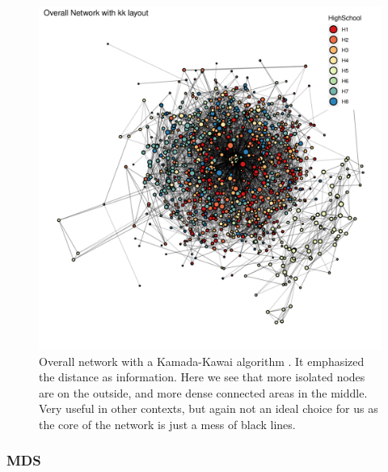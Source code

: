     \begin{figure}[h]
        \centering
            \includegraphics[width=0.7\linewidth]{figures/Networks/Layouts/Graph_OverallNetwork_with_no_highlight_kk_HighSchool___kk.png} 
        \caption{Overall network with a Kamada-Kawai algorithm \cite{Kamada1989}. It emphasized the distance as information. Here we see that more isolated nodes are on the outside, and more dense connected areas in the middle. Very useful in other contexts, but again not an ideal choice for us as the core of the network is just a mess of black lines.}
        \label{figure:networksLayoutsKK}
    \end{figure}    

\clearpage

\subsubsection{MDS}

